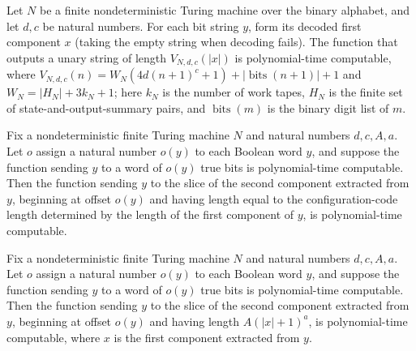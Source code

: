 \begin{theorem}
\label{Complexity.TQBFHard.pt_vlen}
\leanok
{}
Let $N$ be a finite nondeterministic Turing machine over the binary alphabet, and let
$d,c$ be natural numbers. For each bit string $y$, form its decoded first component $x$
(taking the empty string when decoding fails). The function that outputs a unary string
of length $V_{N,d,c}(|x|)$ is polynomial-time computable, where
$V_{N,d,c}(n)=W_N(4d(n+1)^c+1)+|\operatorname{bits}(n+1)|+1$ and $W_N=|H_N|+3k_N+1$;
here $k_N$ is the number of work tapes, $H_N$ is the finite set of
state-and-output-summary pairs, and $\operatorname{bits}(m)$ is the binary digit list of
$m$.
\end{theorem}

\begin{theorem}
\label{Complexity.TQBFHard.pt_cpAt}
\leanok
{}
Fix a nondeterministic finite Turing machine $N$ and natural numbers $d,c,A,a$. Let $o$
assign a natural number $o(y)$ to each Boolean word $y$, and suppose the function
sending $y$ to a word of $o(y)$ true bits is polynomial-time computable. Then the
function sending $y$ to the slice of the second component extracted from $y$, beginning
at offset $o(y)$ and having length equal to the configuration-code length determined by
the length of the first component of $y$, is polynomial-time computable.
\end{theorem}

\begin{theorem}
\label{Complexity.TQBFHard.pt_blkAt}
\leanok
{}
Fix a nondeterministic finite Turing machine $N$ and natural numbers $d,c,A,a$. Let $o$
assign a natural number $o(y)$ to each Boolean word $y$, and suppose the function
sending $y$ to a word of $o(y)$ true bits is polynomial-time computable. Then the
function sending $y$ to the slice of the second component extracted from $y$, beginning
at offset $o(y)$ and having length $A(|x|+1)^a$, is polynomial-time computable, where
$x$ is the first component extracted from $y$.
\end{theorem}

